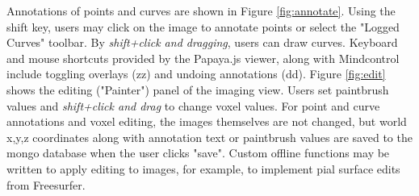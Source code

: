 Annotations of points and curves are shown in Figure \ref{fig:annotate}. Using the shift key, users may click on the image to annotate points or select the "Logged Curves" toolbar. By \textit{shift+click and dragging}, users can draw curves. Keyboard and mouse shortcuts provided by the Papaya.js viewer, along with Mindcontrol include toggling overlays (zz) and undoing annotations (dd). Figure \ref{fig:edit} shows the editing ("Painter") panel of the imaging view. Users set paintbrush values and \textit{shift+click and drag} to change voxel values. For point and curve annotations and voxel editing, the images themselves are not changed, but world x,y,z coordinates along with annotation text or paintbrush values are saved to the mongo database when the user clicks "save". Custom offline functions may be written to apply editing to images, for example, to implement pial surface edits from Freesurfer. 